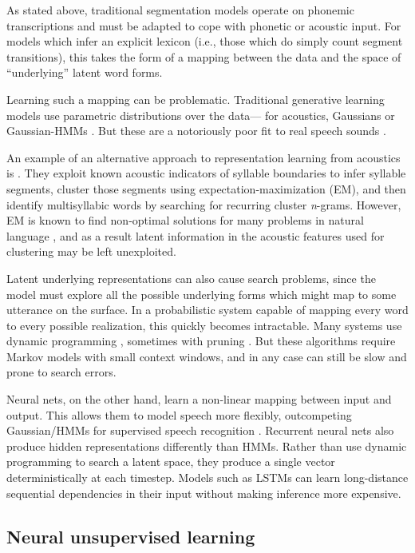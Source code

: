\documentclass[11pt,letterpaper]{article}
\begin{document}
As stated above, traditional segmentation models operate on phonemic
transcriptions and must be adapted to cope with phonetic or acoustic
input. For models which infer an explicit lexicon (i.e., those which
do simply count segment transitions), this takes the form of a mapping
between the data and the space of ``underlying'' latent word
forms.

Learning such a mapping can be problematic. Traditional generative
learning models use parametric distributions over the data--- for
acoustics, Gaussians \cite{Vallabha07,Feldman09} or Gaussian-HMMs
\cite{Lee12,Lee15}. But these are a notoriously poor fit to real speech sounds
\cite{Glass?}.

An example of an alternative approach to representation learning from acoustics is .
They exploit known acoustic indicators of syllable boundaries to infer syllable segments, cluster those segments using expectation-maximization (EM), and then identify multisyllabic words by searching for recurring cluster \textit{n}-grams.
However, EM is known to find non-optimal solutions for many problems in natural language \cite{Johnson07}, and as a result latent information in the acoustic features used for clustering may be left unexploited.

Latent underlying representations can also cause search problems,
since the model must explore all the possible underlying forms which
might map to some utterance on the surface. In a probabilistic system
capable of mapping every word to every possible realization, this
quickly becomes intractable. Many systems use dynamic programming
\cite{Mochihashi09,Neubig10}, sometimes with pruning
\cite{vanGael08}. But these algorithms require Markov models with
small context windows, and in any case can still be slow and prone to
search errors.

Neural nets, on the other hand, learn a non-linear mapping between
input and output. This allows them to model speech more flexibly,
outcompeting Gaussian/HMMs for supervised speech recognition
\cite{Graves13,Hinton12}. Recurrent neural nets also produce hidden
representations differently than HMMs. Rather than use dynamic
programming to search a latent space, they produce a single vector
deterministically at each timestep. Models such as LSTMs
\cite{Hochreiter97} can learn long-distance sequential dependencies in
their input without making inference more expensive.

\subsection{Neural unsupervised learning}
\label{sub-neural}
\end{document}
